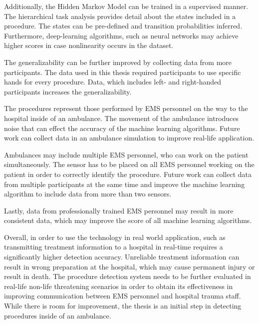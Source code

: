 \par Additionally, the Hidden Markov Model can be trained in a supervised manner. The hierarchical task analysis provides detail about the states included in a procedure. The states can be pre-defined and transition probabilities inferred. Furthermore, deep-learning algorithms, such as neural networks may achieve higher scores in case nonlinearity occurs in the dataset.
\par The generalizability can be further improved by collecting data from more participants. The data used in this thesis required participants to use specific hands for every procedure. Data, which includes left- and right-handed participants increases the generalizability.
\par The procedures represent those performed by EMS personnel on the way to the hospital inside of an ambulance. The movement of the ambulance introduces noise that can effect the accuracy of the machine learning algorithms. Future work can collect data in an ambulance simulation to improve real-life application.
\par Ambulances may include multiple EMS personnel, who can work on the patient simultaneously. The sensor has to be placed on all EMS personnel working on the patient in order to correctly identify the procedure. Future work can collect data from multiple participants at the same time and improve the machine learning algorithm to include data from more than two sensors.
\par Lastly, data from professionally trained EMS personnel may result in more consistent data, which may improve the score of all machine learning algorithms.
\par Overall, in order to use the technology in real world application, such as transmitting treatment information to a hospital in real-time requires a significantly higher detection accuracy. Unreliable treatment information can result in wrong preparation at the hospital, which may cause permanent injury or result in death. The procedure detection system needs to be further evaluated in real-life non-life threatening scenarios in order to obtain its effectiveness in improving communication between EMS personnel and hospital trauma staff. While there is room for improvement, the thesis is an initial step in detecting procedures inside of an ambulance.
